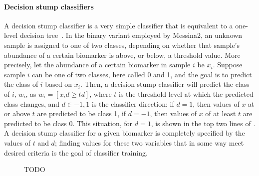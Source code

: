 \documentclass[dissertation.tex]{subfiles}
\begin{document}
\paragraph{Decision stump classifiers}
A decision stump classifier is a very simple classifier that is equivalent to a one-level decision tree~\cite{Iba1992}.  In the binary variant employed by Messina2, an unknown sample is assigned to one of two classes, depending on whether that sample's abundance of a certain biomarker is above, or below, a threshold value.  More precisely, let the abundance of a certain biomarker in sample $i$ be $x_i$.  Suppose sample $i$ can be one of two classes, here called 0 and 1, and the goal is to predict the class of $i$ based on $x_i$.  Then, a decision stump classifier will predict the class of $i$, $w_i$, as $w_i = [ x_i d \geq t d ]$, where $t$ is the threshold level at which the predicted class changes, and $d \in {-1, 1}$ is the classifier direction: if $d = 1$, then values of $x$ at or above $t$ are predicted to be class 1, if $d = -1$, then values of $x$ of at least $t$ are predicted to be class 0.  This situation, for $d = 1$, is shown in the top two lines of .  A decision stump classifier for a given biomarker is completely specified by the values of $t$ and $d$; finding values for these two variables that in some way meet desired criteria is the goal of classifier training.

\begin{figure}[!htbp]
\centering
\def\svgwidth{\linewidth} 

\caption[]{TODO}\label{fig:mess-thresh-1}
\end{figure}
\end{document}
